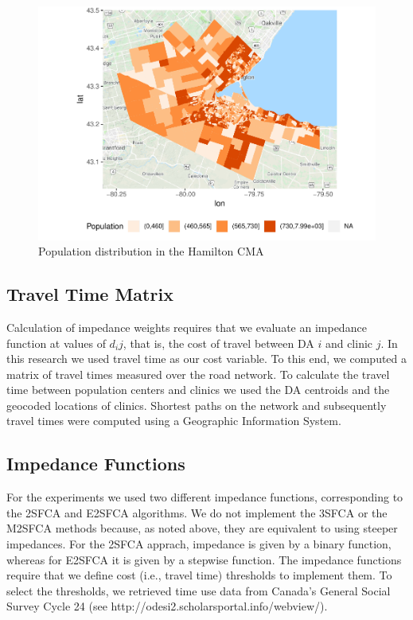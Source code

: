 \documentclass[10pt,letterpaper]{article}
\begin{document}
\begin{figure}
\centering
\includegraphics{Supply_and_Demand_Inflation_in_FCA_Methods_v2.0_files/figure-latex/fig4-population-map-1.pdf}
\caption{\label{fig:fig4-population-map}Population distribution in the
Hamilton CMA}
\end{figure}

\subsection{Travel Time Matrix}\label{travel-time-matrix}

Calculation of impedance weights requires that we evaluate an impedance
function at values of \(d_ij\), that is, the cost of travel between DA
\(i\) and clinic \(j\). In this research we used travel time as our cost
variable. To this end, we computed a matrix of travel times measured
over the road network. To calculate the travel time between population
centers and clinics we used the DA centroids and the geocoded locations
of clinics. Shortest paths on the network and subsequently travel times
were computed using a Geographic Information System.

\subsection{Impedance Functions}\label{impedance-functions}

For the experiments we used two different impedance functions,
corresponding to the 2SFCA and E2SFCA algorithms. We do not implement
the 3SFCA or the M2SFCA methods because, as noted above, they are
equivalent to using steeper impedances. For the 2SFCA apprach, impedance
is given by a binary function, whereas for E2SFCA it is given by a
stepwise function. The impedance functions require that we define cost
(i.e., travel time) thresholds to implement them. To select the
thresholds, we retrieved time use data from Canada's General Social
Survey Cycle 24 (see http://odesi2.scholarsportal.info/webview/).
\end{document}
